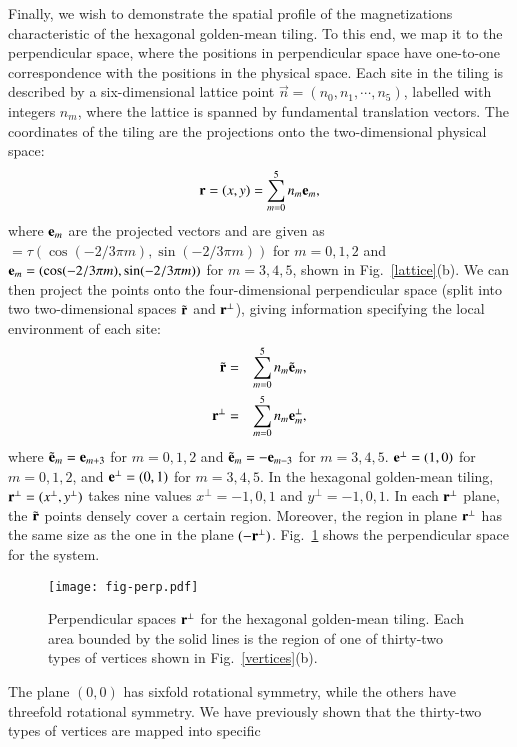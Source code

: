 \documentclass[aps,twocolumn,pra,superscriptaddress,amsmath,amssymb]{revtex4-1}
\begin{document}
Finally, we wish to demonstrate the spatial profile of the magnetizations
characteristic of the hexagonal golden-mean tiling.
To this end, we map it to the perpendicular space, where the positions in perpendicular space have one-to-one correspondence with
the positions in the physical space.
Each site in the tiling is described by a six-dimensional
lattice point $\vec{n}=(n_0, n_1, \cdots, n_5)$, labelled with integers $n_m$, where the lattice is spanned by fundamental translation vectors.
The coordinates of the tiling are the projections onto the two-dimensional
physical space:
\begin{eqnarray}
{\bf r} = (x, y) = \sum_{m=0}^5 n_m{\bf e}_m,
\end{eqnarray}
where ${\bf e}_m$ are the projected vectors and are given as $=\tau(\cos(-2/3\pi m),\sin(-2/3\pi m))$ for $m=0,1,2$ and
${\bf e}_m=(\cos(-2/3\pi m),\sin(-2/3\pi m))$ for $m=3,4,5$, shown in Fig.~\ref{lattice}(b).
We can then project the points onto the four-dimensional perpendicular space (split into two two-dimensional spaces $\tilde{\bf r}$ and $ {\bf r}^\perp$), giving information
specifying the local environment of each site:
\begin{eqnarray}
  \tilde{\bf r}&=&\sum_{m=0}^5n_m\tilde{\bf e}_m,\\
  {\bf r}^\perp&=&\sum_{m=0}^5n_m{\bf e}_m^\perp,
\end{eqnarray}
where $\tilde{\bf e}_m={\bf e}_{m+3}$ for $m=0,1,2$ and
$\tilde{\bf e}_m=-{\bf e}_{m-3}$ for $m=3,4,5$.
${\bf e}^\perp=(1,0)$ for $m=0,1,2$, and ${\bf e}^\perp=(0,1)$ for $m=3,4,5$.
In the hexagonal golden-mean tiling, ${\bf r}^\perp=(x^\perp,y^\perp)$
takes nine values $x^\perp=-1,0,1$ and $y^\perp=-1,0,1$.
In each ${\bf r}^\perp$ plane, the $\tilde{\bf r}$ points densely
cover a certain region.
Moreover, the region in plane ${\bf r}^\perp$ has the same size as the one in the plane $(-{\bf r}^\perp)$.  
Fig.~\ref{perp} shows the perpendicular space for the system.
\begin{figure}[htb]
 \texttt{[image: fig-perp.pdf]}
 \caption{
   Perpendicular spaces ${\bf r}^\perp$ for the hexagonal golden-mean tiling.
   Each area bounded by the solid lines is the region of one of thirty-two types of vertices
   shown in Fig.~\ref{vertices}(b).
 }
 \label{perp}
\end{figure}
The plane $(0,0)$ has sixfold rotational symmetry, while
the others have threefold rotational symmetry.
We have previously shown that the thirty-two types of vertices are mapped into specific
\end{document}
